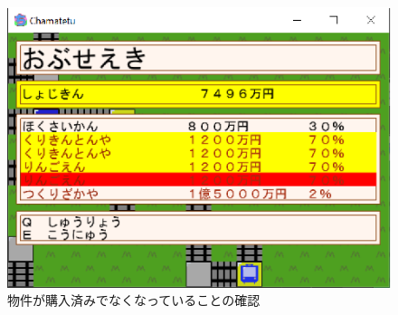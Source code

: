 \documentclass[a4j]{jarticle}
\begin{document}
        \begin{figure}[H]
            \centering
            \includegraphics[scale=1.3]{hokusai.eps}
            \caption{物件が購入済みでなくなっていることの確認}
             \label{hokusai}
            \end{figure}
\end{document}

